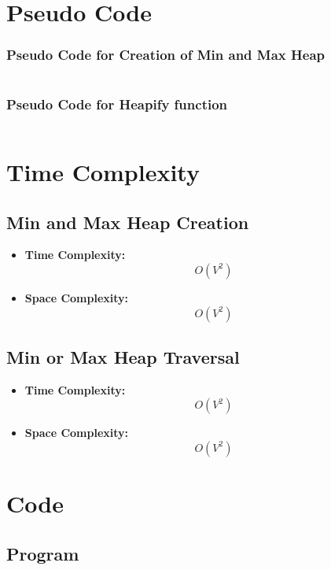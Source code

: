 \documentclass[11pt]{article}
\begin{document}
\section{Pseudo Code}
\subsubsection*{Pseudo Code for Creation of Min and Max Heap}
\begin{lstlisting}[language=c++]

\end{lstlisting}
\subsubsection*{Pseudo Code for Heapify function}
\begin{lstlisting}[language=c++]

\end{lstlisting}


\section{Time Complexity}

\subsection{Min and Max Heap Creation}
\begin{itemize}
    \item \textbf{Time Complexity:} \[O(V^2)\]
    \item \textbf{Space Complexity:} \[O(V^2)\]
\end{itemize}

\subsection{Min or Max Heap Traversal}

\begin{itemize}
    \item \textbf{Time Complexity:} \[O(V^2)\]
    \item \textbf{Space Complexity:} \[O(V^2)\]
\end{itemize}

\section{Code}

\subsection{Program}

\end{document}
